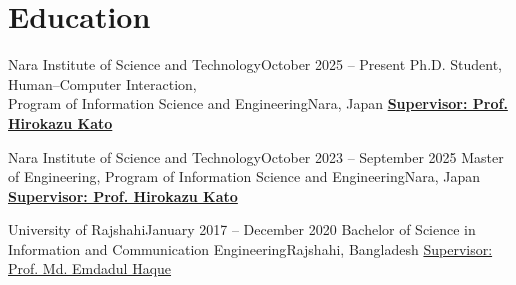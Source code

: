 \section{Education}
\cvSubHeadingListStart
\cvSubheading
{Nara Institute of Science and Technology}{October 2025 -- Present}
{Ph.D. Student, Human--Computer Interaction, \\Program of Information Science and Engineering}{Nara, Japan}
\cvSubSubheading
{{\href{https://scholar.google.com/citations?user=zlyaC60AAAAJ&hl=en}{\textbf{Supervisor: Prof. Hirokazu Kato}}}}{}

\vspace{-2pt}
\cvItemListStart
{}
\cvItemListEnd

\cvSubheading
{Nara Institute of Science and Technology}{October 2023 -- September 2025}
{Master of Engineering, Program of Information Science and Engineering}{Nara, Japan}
\cvSubSubheading
{{\href{https://scholar.google.com/citations?user=zlyaC60AAAAJ&hl=en}{\textbf{Supervisor: Prof. Hirokazu Kato}}}}{}

\vspace{-2pt}
\cvItemListStart
{}
\cvItemListEnd

\cvSubheading
{University of Rajshahi}{January 2017 -- December 2020}
{Bachelor of Science in Information and Communication Engineering}{Rajshahi, Bangladesh}
\cvSubSubheading
{{\href{https://scholar.google.com/citations?user=D0cqricAAAAJ&hl=en}{Supervisor: Prof. Md. Emdadul Haque}}}{}

\cvItemListStart
{}
\cvItemListEnd
\cvSubHeadingListEnd